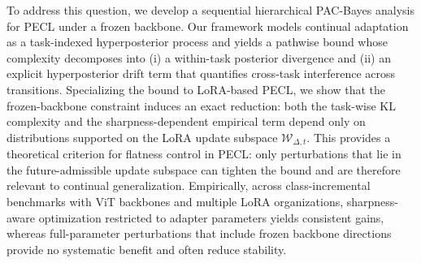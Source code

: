 \documentclass{article}
\theoremstyle{plain}
\theoremstyle{definition}
\theoremstyle{remark}
\begin{document}
To address this question, we develop a sequential hierarchical PAC-Bayes analysis for PECL under a frozen backbone. Our framework models continual adaptation as a task-indexed hyperposterior process and yields a pathwise bound whose complexity decomposes into (i) a within-task posterior divergence and (ii) an explicit hyperposterior drift term that quantifies cross-task interference across transitions.
Specializing the bound to LoRA-based PECL, we show that the frozen-backbone constraint induces an exact reduction: both the task-wise KL complexity and the sharpness-dependent empirical term depend only on distributions supported on the LoRA update subspace $\mathcal W_{\Delta,t}$. This provides a theoretical criterion for flatness control in PECL: only perturbations that lie in the future-admissible update subspace can tighten the bound and are therefore relevant to continual generalization.
Empirically, across class-incremental benchmarks with ViT backbones and multiple LoRA organizations, sharpness-aware optimization restricted to adapter parameters yields consistent gains, whereas full-parameter perturbations that include frozen backbone directions provide no systematic benefit and often reduce stability.

\end{document}
